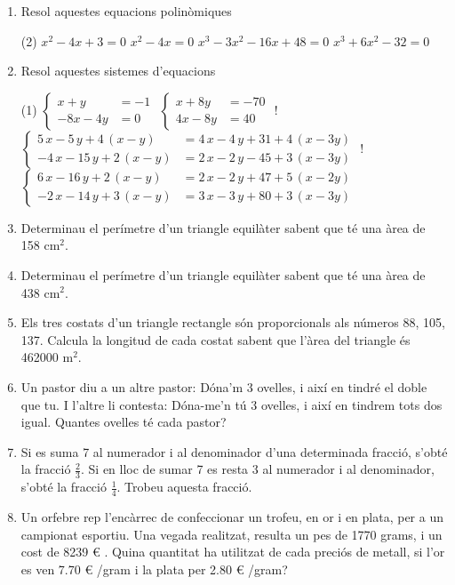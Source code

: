 \documentclass[a4paper]{article},
\begin{document}
\begin{enumerate}[resume]
    \item Resol aquestes equacions polinòmiques
    \begin{tasks}(2)
      \task $ x^{2} -4 x + 3 =0$
      \task $ x^{2} -4 x  =0$
      \task $ x^{3} -3 x^{2} -16 x + 48 =0$
      \task $ x^{3} + 6 x^{2}  -32 =0$
    \end{tasks}
    \item Resol aquestes sistemes d'equacions
    \begin{tasks}(1)
      \task $\left\{ \begin{array}{ll}  x + y&=-1\\-8 x-4 y&=0\end{array} \right.$
      \task $\left\{ \begin{array}{ll}  x + 8 y&=-70\\4 x-8 y&=40\end{array} \right.$
      \task! $\left\{ \begin{array}{ll}  5\,  x-5\,  y + 4 \,  (x-y)&=4\,  x-4\,  y+31 + 4 \,  (x-3y )\\-4\,  x-15\,  y + 2 \,  (x-y)&=2\,  x-2\,  y-45 + 3 \,  (x-3y )\end{array} \right.$
      \task! $\left\{ \begin{array}{ll}  6\,  x-16\,  y + 2 \,  (x-y)&=2\,  x-2\,  y+47 + 5 \,  (x-2y )\\-2\,  x-14\,  y + 3 \,  (x-y)&=3\,  x-3\,  y+80 + 3 \,  (x-3y )\end{array} \right.$
    \end{tasks}
    \item Determinau el perímetre d'un triangle equilàter sabent que té una àrea de 158 cm$^2$.
    \item Determinau el perímetre d'un triangle equilàter sabent que té una àrea de 438 cm$^2$.
    \item Els tres costats d'un triangle rectangle són proporcionals als números 88, 105, 137. Calcula la longitud de cada costat sabent que l'àrea del triangle és 462000 m$^2$.
    \item  Un pastor diu a un altre pastor: Dóna'm 3 ovelles, i així en tindré el doble que tu. I
                    l'altre li contesta: Dóna-me'n tú 3 ovelles, i així en tindrem tots dos igual. Quantes ovelles
                    té cada pastor?
    \item Si es suma 7 al numerador i al denominador d'una determinada fracció, s'obté la fracció
                    $\frac{2}{3}$. Si en lloc de sumar 7 es resta 3 al numerador i al denominador, s'obté la fracció
                    $\frac{1}{4}$. Trobeu aquesta fracció.
    \item Un orfebre rep l'encàrrec de confeccionar un trofeu, en or i en plata, per a un
                    campionat esportiu. Una vegada realitzat, resulta un pes de 1770 grams, i un cost de 8239 \euro{} .
                    Quina quantitat ha utilitzat de cada preciós de metall, si l'or es ven 7.70 \euro{} /gram i la plata
                    per 2.80 \euro{} /gram?
     \end{enumerate}
\end{document}
